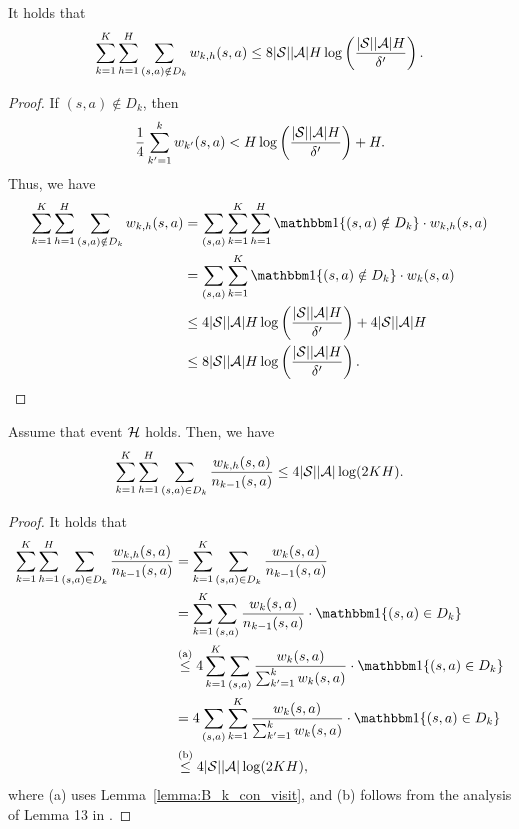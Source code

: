 \begin{lemma} \label{lemma:regret_notin_D_k}
	It holds that
	\begin{align*}
		\sum_{k=1}^{K} \sum_{h=1}^{H} \sum_{(s,a) \notin D_k} w_{k,h}(s,a) \leq 8|\mathcal{S}||\mathcal{A}|H \log\left( \frac{|\mathcal{S}||\mathcal{A}|H}{\delta'} \right) .
	\end{align*}
\end{lemma}
\begin{proof}
	If $(s,a) \notin D_k$, then
	\begin{align*}
		\frac{1}{4} \sum_{k'=1}^{k} w_{k'}(s,a) < H \log\left( \frac{|\mathcal{S}||\mathcal{A}|H}{\delta'} \right) + H .
	\end{align*}
	Thus, we have
	\begin{align*}
		\sum_{k=1}^{K} \sum_{h=1}^{H} \sum_{(s,a) \notin D_k} w_{k,h}(s,a) &= \sum_{(s,a)} \sum_{k=1}^{K} \sum_{h=1}^{H} \indicator\{ (s,a) \notin D_k \} \cdot w_{k,h}(s,a)
		\\
		&= \sum_{(s,a)} \sum_{k=1}^{K} \indicator\{ (s,a) \notin D_k \} \cdot w_{k}(s,a)
		\\
		&\leq 4|\cS||\cA|H \log\sbr{\frac{|\cS||\cA|H}{\delta'}} + 4|\cS||\cA|H 
		\\
		&\leq 8|\cS||\cA|H \log\sbr{\frac{|\cS||\cA|H}{\delta'}} .
	\end{align*}
	
\end{proof}

\begin{lemma} \label{lemma:visitation_ratio}
	Assume that event $\mathcal{H}$ holds. Then, we have
	\begin{align*}
		\sum_{k=1}^{K} \sum_{h=1}^{H} \sum_{(s,a) \in D_k} \frac{w_{k,h}(s,a)}{n_{k-1}(s,a)} \leq 4 |\mathcal{S}| |\mathcal{A}| \log(2KH) .
	\end{align*}
\end{lemma}
\begin{proof}
	It holds that
	\begin{align*}
		\sum_{k=1}^{K} \sum_{h=1}^{H} \sum_{(s,a) \in D_k} \frac{w_{k,h}(s,a)}{n_{k-1}(s,a)} &= \sum_{k=1}^{K}  \sum_{(s,a) \in D_k} \frac{w_{k}(s,a)}{n_{k-1}(s,a)}
		\\
		&= \sum_{k=1}^{K}  \sum_{(s,a)} \frac{w_{k}(s,a)}{n_{k-1}(s,a)} \cdot \indicator\{ (s,a) \in D_k \}
		\\
		&\overset{\textup{(a)}}{\leq} 4 \sum_{k=1}^{K}  \sum_{(s,a)} \frac{w_{k}(s,a)}{\sum_{k'=1}^{k} w_k(s,a)} \cdot \indicator\{ (s,a) \in D_k \}
		\\
		&= 4 \sum_{(s,a)} \sum_{k=1}^{K} \frac{w_{k}(s,a)}{\sum_{k'=1}^{k} w_k(s,a)} \cdot \indicator\{ (s,a) \in D_k \}
		\\
		&\overset{\textup{(b)}}{\leq} 4 |\cS| |\cA| \log(2KH) ,
	\end{align*}
	where (a) uses Lemma~\ref{lemma:B_k_con_visit}, and (b) follows from the analysis of Lemma 13 in \cite{zanette2019tighter}.
\end{proof}

